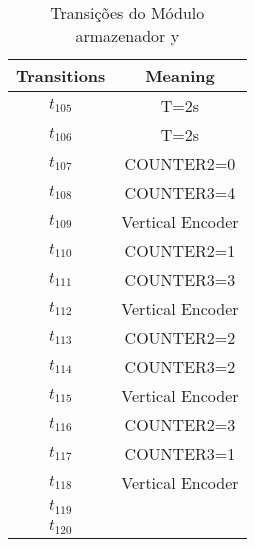 \begin{table}[htbp]
\caption{Transições do Módulo armazenador y}
\centering
\begin{tabular}{c|c}
Transitions & Meaning\\
\hline
\hyperlink{partialNet:tt105}{\hypertarget{partialTable:tt105}{$t_{105}$}} & T=2s\\
\hyperlink{partialNet:tt106}{\hypertarget{partialTable:tt106}{$t_{106}$}} & T=2s\\
\hyperlink{partialNet:t107}{\hypertarget{partialTable:t107}{$t_{107}$}} & COUNTER2=0\\
\hyperlink{partialNet:t108}{\hypertarget{partialTable:t108}{$t_{108}$}} & COUNTER3=4\\
\hyperlink{partialNet:t109}{\hypertarget{partialTable:t109}{$t_{109}$}} & Vertical Encoder\\
\hyperlink{partialNet:t110}{\hypertarget{partialTable:t110}{$t_{110}$}} & COUNTER2=1\\
\hyperlink{partialNet:t111}{\hypertarget{partialTable:t111}{$t_{111}$}} & COUNTER3=3\\
\hyperlink{partialNet:t112}{\hypertarget{partialTable:t112}{$t_{112}$}} & Vertical Encoder\\
\hyperlink{partialNet:t113}{\hypertarget{partialTable:t113}{$t_{113}$}} & COUNTER2=2\\
\hyperlink{partialNet:t114}{\hypertarget{partialTable:t114}{$t_{114}$}} & COUNTER3=2\\
\hyperlink{partialNet:t115}{\hypertarget{partialTable:t115}{$t_{115}$}} & Vertical Encoder\\
\hyperlink{partialNet:t116}{\hypertarget{partialTable:t116}{$t_{116}$}} & COUNTER2=3\\
\hyperlink{partialNet:t117}{\hypertarget{partialTable:t117}{$t_{117}$}} & COUNTER3=1\\
\hyperlink{partialNet:t118}{\hypertarget{partialTable:t118}{$t_{118}$}} & Vertical Encoder\\
\hyperlink{partialNet:t119}{\hypertarget{partialTable:t119}{$t_{119}$}} & \\
\hyperlink{partialNet:t120}{\hypertarget{partialTable:t120}{$t_{120}$}} & \\
\end{tabular}
\end{table}
